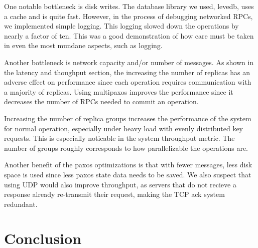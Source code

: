 \documentclass[letterpaper,10pt]{article}
\begin{document}
One notable bottleneck is disk writes. The database library we used,
levedb, uses a cache and is quite fast. However, in the process of
debugging networked RPCs, we implemented simple logging. This logging
slowed down the operations by nearly a factor of ten. This was a good
demonstration of how care must be taken in even the most mundane
aspects, such as logging.

Another bottleneck is network capacity and/or number of messages. As
shown in the latency and thoughput section, the increasing the number
of replicas has an adverse effect on performance since each operation
requires communication with a majority of replicas. Using multipaxos
improves the performance since it decreases the number of RPCs needed
to commit an operation. 

Increasing the number of replica groups increases the performance of
the system for normal operation, especially under heavy load with
evenly distributed key requests. This is especially noticable in the
system throughput metric.  The number of groups roughly corresponds to
how parallelizable the operations are. 

Another benefit of the paxos optimizations is that with
fewer messages, less disk space is used since less paxos state data
needs to be saved. We also suspect that using UDP would also improve
throughput, as servers that do not recieve a response already
re-transmit their request, making the TCP ack system redundant.

\section{Conclusion}


\end{document}
